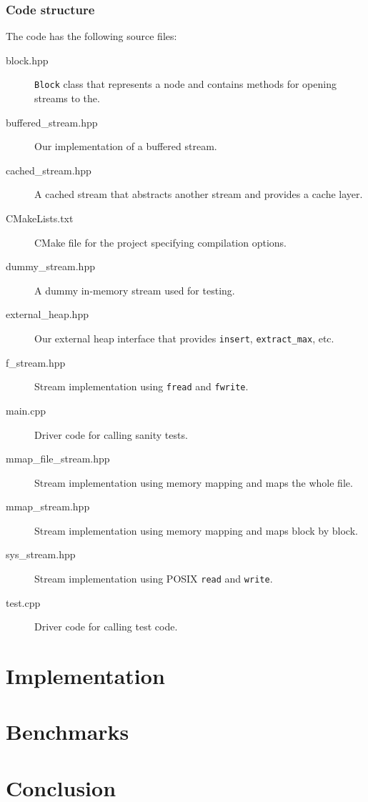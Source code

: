 \documentclass[a4paper,12pt]{article}
\begin{document}
\subsubsection{Code structure}
The code has the following source files:
\begin{description}


\item[block.hpp] \texttt{Block} class that represents a node and contains methods for opening streams to the.

\item[buffered\_stream.hpp] Our implementation of a buffered stream.

\item[cached\_stream.hpp] A cached stream that abstracts another stream and provides a cache layer.

\item[CMakeLists.txt] CMake file for the project specifying
  compilation options.

\item[dummy\_stream.hpp] A dummy in-memory stream used for testing.

\item[external\_heap.hpp] Our external heap interface that provides \texttt{insert}, \texttt{extract\_max}, etc.

\item[f\_stream.hpp] Stream implementation using \texttt{fread} and \texttt{fwrite}.

\item[main.cpp] Driver code for calling sanity tests.

\item[mmap\_file\_stream.hpp] Stream implementation using memory mapping and maps the whole file.

\item[mmap\_stream.hpp] Stream implementation using memory mapping and maps block by block.

\item[sys\_stream.hpp] Stream implementation using POSIX \texttt{read} and \texttt{write}.

\item[test.cpp] Driver code for calling test code.

\end{description}

\section{Implementation}


\section{Benchmarks}


\section{Conclusion}


\clearpage{}
\end{document}
